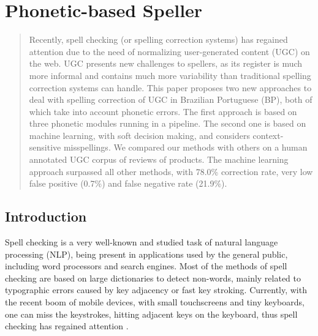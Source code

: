 \chapter{Phonetic-based Speller}\label{ch:speller}

\begin{abstract}
Recently, spell checking (or spelling correction systems) has regained attention 
due to the need of normalizing user-generated content (UGC) on the web. UGC presents 
new challenges to spellers, as its register is much more informal and contains much
more variability than traditional spelling correction systems can handle. This paper proposes 
two new approaches to deal with spelling correction of UGC in Brazilian Portuguese (BP), 
both of which take into account phonetic errors. The first approach is based on three phonetic
modules running in a pipeline. The second one is based on machine learning, with soft decision 
making, and considers context-sensitive misspellings. We compared our methods with 
others on a human annotated UGC corpus of reviews of products. The machine learning approach surpassed 
all other methods, with 78.0\% correction rate, very low false positive (0.7\%) and false 
negative rate (21.9\%). 
\end{abstract}

\section{Introduction}

Spell checking is a very well-known and studied task of natural language processing (NLP), being present in applications used by the general public, including word processors and search engines. Most of the methods of spell checking are based on large dictionaries to detect non-words, mainly related to typographic errors caused by key adjacency or fast key stroking. 
Currently, with the recent boom of mobile devices, with small touchscreens and tiny keyboards, one can miss the keystrokes, hitting adjacent keys on the keyboard, thus spell checking has regained attention \cite{Duan2011}.   

